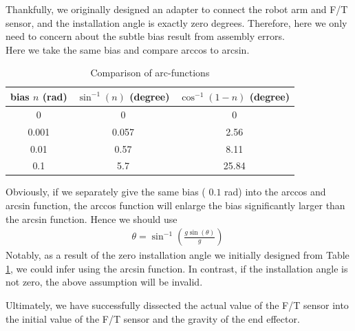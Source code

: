 Thankfully, we originally designed an adapter to connect the robot arm and F/T sensor, and the installation angle is exactly zero degrees. Therefore, here we only need to concern about the subtle bias result from assembly errors.\\
Here we take the same bias and compare arccos to arcsin. 
\begin{table}[htbp]
\centering
\caption{Comparison of arc-functions}
\label{tab:arc}
\begin{tabular}{c|c|c} 
\hline \hline
bias $n$ (rad)	&$\sin^{-1}(n)$	(degree)	&$\cos^{-1}(1-n)$ (degree)\\
\hline
0				&0							&0\\
0.001			&0.057						&2.56\\
0.01			&0.57						&8.11\\
0.1				&5.7						&25.84\\
\hline\hline
\end{tabular}
\end{table}
Obviously, if we separately give the same bias ( $0.1$ rad) into the arccos and arcsin function, the arccos function will enlarge the bias significantly larger than the arcsin function. Hence we should use
\begin{equation}
\begin{split}
\theta = \sin^{-1}\left(\frac{g\sin(\theta)}{g}\right)\
\end{split}
\end{equation}
Notably, as a result of the zero installation angle we initially designed from Table \ref{tab:arc}, we could infer using the arcsin function. In contrast, if the installation angle is not zero, the above assumption will be invalid.
\par
Ultimately, we have successfully dissected the actual value of the F/T sensor into the initial value of the F/T sensor and the gravity of the end effector. 
